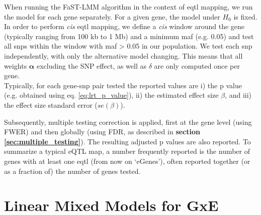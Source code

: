 When running the FaST-LMM algorithm in the context of \gls{eqtl} mapping, we run the model for each gene separately.
For a given gene, the model under $H_0$ is fixed.
In order to perform \textit{cis} \gls{eqtl} mapping, we define a \textit{cis} window around the gene (typically ranging from 100 kb to 1 Mb) and a minimum \gls{maf} (e.g. 0.05) and test all \gls{snp}s within the window with \gls{maf} > 0.05 in our population.  
We test each \gls{snp} independently, with only the alternative model changing.
This means that all weights $\boldsymbol{\alpha}$ excluding the SNP effect, as well as $\delta$ are only computed once per gene.\\

Typically, for each gene-\gls{snp} pair tested the reported values are i) the p value (e.g. obtained using eq. \eqref{eq:lrt_p_value}), ii) the estimated effect size $\beta$, and iii) the effect size standard error ($se(\beta)$).


Subsequently, multiple testing correction is applied, first at the gene level (using FWER) and then globally (using FDR, as described in \textbf{section \ref{sec:multiple_testing}}).
The resulting adjusted p values are also reported.
To summarize a typical eQTL map, a number frequently reported is the number of genes with at least one \gls{eqtl} (from now on `eGenes'), often reported together (or as a fraction of) the number of genes tested. \\







\section{Linear Mixed Models for GxE}
\label{sec:lmm_gxe}

